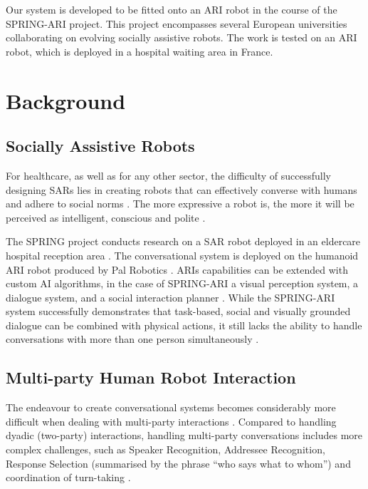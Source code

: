 \documentclass[hidelinks, 11pt]{article}
\begin{document}
Our system is developed to be fitted onto an ARI robot in the course of the SPRING-ARI project. This project encompasses several European universities collaborating on evolving socially assistive robots. The work is tested on an ARI robot, which is deployed in a hospital waiting area in France.

\section{Background}
\label{sec:background}

\subsection{Socially Assistive Robots}
\label{subsec:socially_assistive_robots}
For healthcare, as well as for any other sector, the difficulty of successfully designing SARs lies in creating robots that can effectively converse with humans and adhere to social norms \cite{moujahid_multi_party_2022}. The more expressive a robot is, the more it will be perceived as intelligent, conscious and polite \cite{moujahid_multi_party_2022}.

The SPRING project conducts research on a SAR robot deployed in an eldercare hospital reception area \cite{addlesee_comprehensive_2020}. The conversational system is deployed on the humanoid ARI robot produced by Pal Robotics \cite{palrobot}. ARIs capabilities can be extended with custom AI algorithms, in the case of SPRING-ARI a visual perception system, a dialogue system, and a social interaction planner \cite{addlesee_comprehensive_2020}. While the SPRING-ARI system successfully demonstrates that task-based, social and visually grounded dialogue can be combined with physical actions, it still lacks the ability to handle conversations with more than one person simultaneously \cite{addlesee_comprehensive_2020}.

\subsection{Multi-party Human Robot Interaction}
\label{subsec:multi_party}
The endeavour to create conversational systems becomes considerably more difficult when dealing with multi-party interactions \cite{Addlesee_Data_2023}. Compared to handling dyadic (two-party) interactions, handling multi-party conversations includes more complex challenges, such as Speaker Recognition, Addressee Recognition, Response Selection (summarised by the phrase ``who says what to whom'') and coordination of turn-taking \cite{Addlesee_Data_2023,Johansson_Skantze_2015}.
\end{document}
